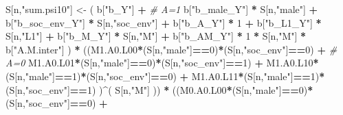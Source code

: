 \documentclass[
]{book}
\newenvironment{Shaded}{\begin{snugshade}}{\end{snugshade}}
\newcommand{\CommentTok}[1]{\textcolor[rgb]{0.56,0.35,0.01}{\textit{#1}}}
\newcommand{\DecValTok}[1]{\textcolor[rgb]{0.00,0.00,0.81}{#1}}
\newcommand{\NormalTok}[1]{#1}
\newcommand{\OtherTok}[1]{\textcolor[rgb]{0.56,0.35,0.01}{#1}}
\newcommand{\SpecialCharTok}[1]{\textcolor[rgb]{0.81,0.36,0.00}{\textbf{#1}}}
\newcommand{\StringTok}[1]{\textcolor[rgb]{0.31,0.60,0.02}{#1}}
\begin{document}
\begin{Shaded}
\begin{Highlighting}[]
\NormalTok{    S[n,}\StringTok{"sum.psi10"}\NormalTok{] }\OtherTok{\textless{}{-}}\NormalTok{  ( b[}\StringTok{"b\_Y"}\NormalTok{] }\SpecialCharTok{+}                                           \CommentTok{\# A=1}
\NormalTok{                             b[}\StringTok{"b\_male\_Y"}\NormalTok{] }\SpecialCharTok{*}\NormalTok{ S[n,}\StringTok{"male"}\NormalTok{] }\SpecialCharTok{+} 
\NormalTok{                             b[}\StringTok{"b\_soc\_env\_Y"}\NormalTok{] }\SpecialCharTok{*}\NormalTok{ S[n,}\StringTok{"soc\_env"}\NormalTok{] }\SpecialCharTok{+} 
\NormalTok{                             b[}\StringTok{"b\_A\_Y"}\NormalTok{] }\SpecialCharTok{*} \DecValTok{1} \SpecialCharTok{+} 
\NormalTok{                             b[}\StringTok{"b\_L1\_Y"}\NormalTok{] }\SpecialCharTok{*}\NormalTok{ S[n,}\StringTok{"L1"}\NormalTok{] }\SpecialCharTok{+}
\NormalTok{                             b[}\StringTok{"b\_M\_Y"}\NormalTok{] }\SpecialCharTok{*}\NormalTok{ S[n,}\StringTok{"M"}\NormalTok{] }\SpecialCharTok{+}
\NormalTok{                             b[}\StringTok{"b\_AM\_Y"}\NormalTok{] }\SpecialCharTok{*} \DecValTok{1} \SpecialCharTok{*}\NormalTok{ S[n,}\StringTok{"M"}\NormalTok{] }\SpecialCharTok{*}\NormalTok{ b[}\StringTok{"A.M.inter"}\NormalTok{] ) }\SpecialCharTok{*}
\NormalTok{      ((M1.A0.L00}\SpecialCharTok{*}\NormalTok{(S[n,}\StringTok{"male"}\NormalTok{]}\SpecialCharTok{==}\DecValTok{0}\NormalTok{)}\SpecialCharTok{*}\NormalTok{(S[n,}\StringTok{"soc\_env"}\NormalTok{]}\SpecialCharTok{==}\DecValTok{0}\NormalTok{) }\SpecialCharTok{+}                    \CommentTok{\# A\textquotesingle{}=0}
\NormalTok{          M1.A0.L01}\SpecialCharTok{*}\NormalTok{(S[n,}\StringTok{"male"}\NormalTok{]}\SpecialCharTok{==}\DecValTok{0}\NormalTok{)}\SpecialCharTok{*}\NormalTok{(S[n,}\StringTok{"soc\_env"}\NormalTok{]}\SpecialCharTok{==}\DecValTok{1}\NormalTok{) }\SpecialCharTok{+}
\NormalTok{          M1.A0.L10}\SpecialCharTok{*}\NormalTok{(S[n,}\StringTok{"male"}\NormalTok{]}\SpecialCharTok{==}\DecValTok{1}\NormalTok{)}\SpecialCharTok{*}\NormalTok{(S[n,}\StringTok{"soc\_env"}\NormalTok{]}\SpecialCharTok{==}\DecValTok{0}\NormalTok{) }\SpecialCharTok{+} 
\NormalTok{          M1.A0.L11}\SpecialCharTok{*}\NormalTok{(S[n,}\StringTok{"male"}\NormalTok{]}\SpecialCharTok{==}\DecValTok{1}\NormalTok{)}\SpecialCharTok{*}\NormalTok{(S[n,}\StringTok{"soc\_env"}\NormalTok{]}\SpecialCharTok{==}\DecValTok{1}\NormalTok{) )}\SpecialCharTok{\^{}}\NormalTok{( S[n,}\StringTok{"M"}\NormalTok{] )) }\SpecialCharTok{*}
\NormalTok{      ((M0.A0.L00}\SpecialCharTok{*}\NormalTok{(S[n,}\StringTok{"male"}\NormalTok{]}\SpecialCharTok{==}\DecValTok{0}\NormalTok{)}\SpecialCharTok{*}\NormalTok{(S[n,}\StringTok{"soc\_env"}\NormalTok{]}\SpecialCharTok{==}\DecValTok{0}\NormalTok{) }\SpecialCharTok{+}                

\end{Highlighting}
\end{Shaded}
\end{document}
